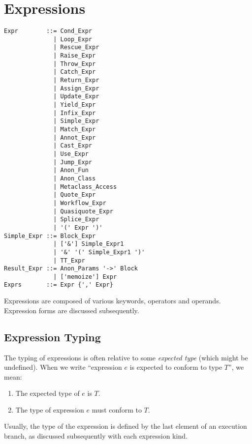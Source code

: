 
\chapter{Expressions}


\syntax\begin{lstlisting}
Expr        ::= Cond_Expr
              | Loop_Expr
              | Rescue_Expr
              | Raise_Expr
              | Throw_Expr
              | Catch_Expr
              | Return_Expr
              | Assign_Expr
              | Update_Expr
              | Yield_Expr
              | Infix_Expr
              | Simple_Expr
              | Match_Expr
              | Annot_Expr
              | Cast_Expr
              | Use_Expr
              | Jump_Expr
              | Anon_Fun
              | Anon_Class
              | Metaclass_Access
              | Quote_Expr
              | Workflow_Expr
              | Quasiquote_Expr
              | Splice_Expr
              | '(' Expr ')'
Simple_Expr ::= Block_Expr
              | ['&'] Simple_Expr1
              | '&' '(' Simple_Expr1 ')'
              | TT_Expr
Result_Expr ::= Anon_Params '->' Block 
              | ['memoize'] Expr
Exprs       ::= Expr {',' Expr}
\end{lstlisting}

Expressions are composed of various keywords, operators and operands. Expression forms are discussed subsequently. 







\section{Expression Typing}
\label{sec:expression-typing}

The typing of expressions is often relative to some {\em expected type} (which might be undefined). When we write ``expression $e$ is expected to conform to type $T$'', we mean:
\begin{enumerate}
\item The expected type of $e$ is $T$.
\item The type of expression $e$ must conform to $T$. 
\end{enumerate}

Usually, the type of the expression is defined by the last element of an execution branch, as discussed subsequently with each expression kind. 

